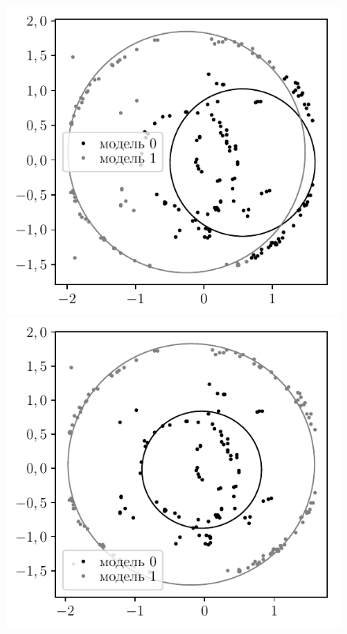 \documentclass[12pt]{a&t}
\begin{document}
{\begin{figure}[h!]
\begin{center}
	\includegraphics[height = 0.17\textheight]{not_prior_real_example}
	\includegraphics[height = 0.17\textheight]{prior_real_example}

\end{center}
\end{figure}}
\end{document}
